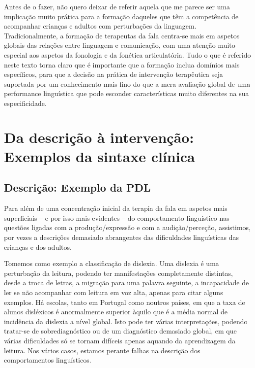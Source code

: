 \documentclass[output=paper,colorlinks,citecolor=brown,booklanguage=portuguese]{langscibook}
\begin{document}
Antes de o fazer, não quero deixar de referir aquela que me parece ser uma implicação muito prática para a formação daqueles que têm a competência de acompanhar crianças e adultos com perturbações da linguagem. Tradicionalmente, a formação de terapeutas da fala centra-se mais em aspetos globais das relações entre linguagem e comunicação, com uma atenção muito especial aos aspetos da fonologia e da fonética articulatória. Tudo o que é referido neste texto torna claro que é importante que a formação inclua domínios mais específicos, para que a decisão na prática de intervenção terapêutica seja suportada por um conhecimento mais fino do que a mera avaliação global de uma performance linguística que pode esconder características muito diferentes na sua especificidade.


\section{Da descrição à intervenção: Exemplos da sintaxe clínica}
\subsection{Descrição: Exemplo da PDL}
Para além de uma concentração inicial da terapia da fala em aspetos mais superficiais -- e por isso mais evidentes -- do comportamento linguístico nas questões ligadas com a produção/expressão e com a audição/perceção, assistimos, por vezes a descrições demasiado abrangentes das dificuldades linguísticas das crianças e dos adultos.

Tomemos como exemplo a classificação de dislexia. Uma dislexia é uma perturbação da leitura, podendo ter manifestações completamente distintas, desde a troca de letras, a migração para uma palavra seguinte, a incapacidade de ler se não acompanhar com leitura em voz alta, apenas para citar alguns exemplos. Há escolas, tanto em Portugal como noutros países, em que a taxa de alunos disléxicos é anormalmente superior àquilo que é a média normal de incidência da dislexia a nível global. Isto pode ter várias interpretações, podendo tratar-se de sobrediagnóstico ou de um diagnóstico demasiado global, em que várias dificuldades só se tornam difíceis apenas aquando da aprendizagem da leitura. Nos vários casos, estamos perante falhas na descrição dos comportamentos linguísticos.
\end{document}
